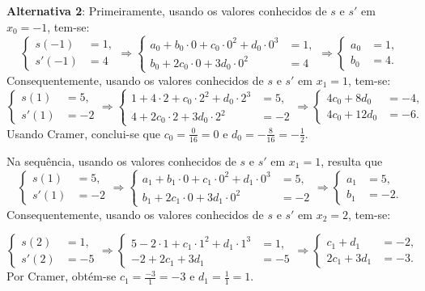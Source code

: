 \documentclass[12pt,a4paper]{article}
\begin{document}
\begin{ExerciseList}
\textbf{Alternativa 2}: Primeiramente, usando os valores conhecidos de \(s\) e \(s'\) em \(x_0 = -1\), tem-se:
\[
  \begin{cases}
    s(-1) & = 1, \\
    s'(-1) & = 4
  \end{cases}
  \Rightarrow
  \begin{cases}
    a_0 + b_0\cdot 0 + c_0\cdot 0^2 + d_0\cdot 0^3 & = 1, \\
    b_0 + 2c_0\cdot 0 + 3d_0\cdot 0^2 & = 4
  \end{cases}
  \Rightarrow
  \begin{cases}
    a_0 & = 1, \\
    b_0 & = 4.
  \end{cases}
\]
Consequentemente, usando os valores conhecidos de \(s\) e \(s'\) em \(x_1 = 1\), tem-se:
\[
  \begin{cases}
    s(1) & = 5, \\
    s'(1) & = -2
  \end{cases}
  \Rightarrow
  \begin{cases}
    1 + 4\cdot 2 + c_0\cdot 2^2 + d_0\cdot 2^3 & = 5, \\
    4 + 2c_0\cdot 2 + 3d_0\cdot 2^2 & = -2
  \end{cases}
  \Rightarrow
  \begin{cases}
    4c_0 + 8d_0 & = -4, \\
    4c_0 + 12d_0 & = -6.
  \end{cases}
\]
Usando Cramer, conclui-se que \(c_0 = \frac{0}{16} = 0\) e \(d_0 = -\frac{8}{16} = -\frac{1}{2}\).

Na sequência, usando os valores conhecidos de \(s\) e \(s'\) em \(x_1 = 1\), resulta que
\[
  \begin{cases}
    s(1) & = 5, \\
    s'(1) & = -2
  \end{cases}
  \Rightarrow
  \begin{cases}
    a_1 + b_1\cdot 0 + c_1\cdot 0^2 + d_1\cdot 0^3 & = 5, \\
    b_1 + 2c_1\cdot 0 + 3d_1\cdot 0^2 & = -2
  \end{cases}
  \Rightarrow
  \begin{cases}
    a_1 & = 5, \\
    b_1 & = -2.
  \end{cases}
\]
Consequentemente, usando os valores conhecidos de \(s\) e \(s'\) em \(x_2 = 2\), tem-se:

\[
  \begin{cases}
    s(2) & = 1, \\
    s'(2) & = -5
  \end{cases}
  \Rightarrow
  \begin{cases}
    5 - 2\cdot 1 + c_1\cdot 1^2 + d_1\cdot 1^3 & = 1, \\
    -2 + 2c_1 + 3d_1 & = -5
  \end{cases}
  \Rightarrow
  \begin{cases}
    c_1 + d_1 & = -2, \\
    2c_1 + 3d_1 & = -3.
  \end{cases}
\]
Por Cramer, obtém-se \(c_1 = \frac{-3}{1} = -3\) e \(d_1 = \frac{1}{1} = 1\).


\end{ExerciseList}
\end{document}
